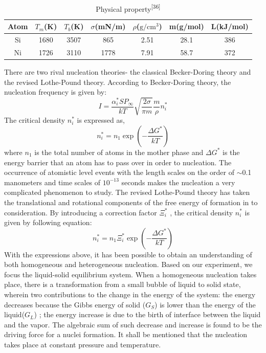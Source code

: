 \begin{table}[H]
\caption{Physical property\textsuperscript{[36]}}
\centering
\begin{tabular}{ccccccc}
\toprule
Atom & $T_{m}$(K) & $T_{b}$(K) & $\sigma$(mN/m)  & $\rho $($\mathrm{g/cm^{3}}$) & m(g/mol) & L(kJ/mol)\\
\midrule
Si   & 1680 & 3507 & 865  & 2.51 & 28.1 & 386 \\
Ni   & 1726 & 3110 & 1778 & 7.91 & 58.7 & 372\\
\bottomrule
\end{tabular}
\end{table}
There are two rival nucleation theories- the classical Becker-Doring theory and the revised Lothe-Pound theory. According to Becker-Doring theory, the nucleation frequency is  given by:
\begin{equation}
I=\frac{\alpha_{i}^{*} S P_{\infty}}{k T} \sqrt{\frac{2 \sigma}{\pi m}} \frac{m}{\rho} n_{i}^{*}  
\tag{3.1.1}
\end{equation}
The critical density $n_{i}^{\ast }$ is expressed as,
\begin{equation}
n_{i}^{*}=n_{1} \exp \left(-\frac{\Delta G^{*}}{k T}\right) 
\tag{3.1.2}
\end{equation}
where $n_{1}$ is the total number of atoms in the mother phase and $\Delta G^{*}$ is the energy barrier that an atom has to pass over in order to nucleation.
The occurrence of atomistic level events with the length scales on the order of $\sim$0.1 manometers and time scales of $10^{-13}$ seconds makes the nucleation a very complicated phenomenon to study. The  revised Lothe-Pound theory has taken the translational and rotational components of  the free energy of formation in to consideration.  By introducing a correction factor $\Xi_{i}^{*} $  , the critical density $n_{i}^{*}$ is given by following equation:
\begin{equation}
n_{i}^{*}=n_{1} \Xi_{i}^{*} \exp \left(-\frac{\Delta G^{*}}{k T}\right)  
\tag{3.1.3}
\end{equation}
With the expressions above, it has been possible to obtain an understanding of both homogeneous and heterogeneous nucleation. Based on our experiment, we focus the liquid-solid equilibrium system.
When a homogeneous nucleation takes place, there is a transformation from a small bubble of liquid to solid state, wherein two contributions to the change in the energy of the system: the energy decreases because the Gibbs energy of solid ($G_{S}$)  is lower than the energy of the liquid($G_{L}$) ; the energy increase is due to the birth of interface between the liquid and the vapor. The algebraic sum of such decrease and  increase is found to be the driving force for a nuclei formation. It shall be mentioned that the nucleation takes place at constant pressure and temperature.
